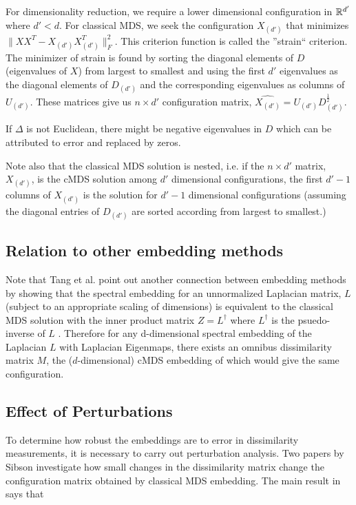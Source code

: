 \documentclass[12pt,oneside,final]{thesis}\usepackage[]{graphicx}\usepackage[]{color}
\begin{document}
For dimensionality reduction, we require a lower dimensional configuration in $\mathbb{R}^{d'}$where $d'<d$. For classical MDS, we seek  the configuration $X_{(d')}$ that minimizes   $\|XX^T-X_{(d')}X_{(d')}^T\|_F^2$. This criterion function is called the ''strain`` criterion. The minimizer of strain is found by sorting the diagonal elements of $D$ (eigenvalues of $X$) from largest to smallest and  using the first $d'$ eigenvalues as the diagonal elements of  $D_{(d')}$ and the corresponding eigenvalues as columns of $U_{(d')}$. These matrices give us $n \times d'$ configuration matrix, $\hat{X_{(d')}}=U_{(d')}D_{(d')}^{\frac{1}{2}}$. 

If $\Delta$ is not Euclidean, there might be negative eigenvalues in $D$ which can be attributed to error and replaced by zeros.

Note also that the classical MDS solution  is nested, i.e. if the $n \times d'$ matrix, $X_{(d')}$,  is the cMDS solution among $d'$ dimensional configurations, the first $d'-1$ columns of $X_{(d')}$ is the solution for $d'-1$ dimensional configurations (assuming the diagonal entries of  $D_{(d')}$ are sorted according from largest to smallest.)


\subsection{Relation to other embedding methods\label{MDS_SpectralEmbed}}

Note that Tang et al.\cite{MinhTrosset_SpectralEmbed} point out another connection between embedding methods by showing that the spectral embedding for  an unnormalized Laplacian matrix, $L$ (subject to  an appropriate scaling of dimensions) is equivalent to the classical MDS solution with the inner product matrix $Z=L^{\dag}$ where $L^{\dag}$ is the psuedo-inverse of $L$ \cite{MinhTrosset_SpectralEmbed}. Therefore for any d-dimensional spectral embedding of the Laplacian $L$  with Laplacian Eigenmaps, there exists an omnibus dissimilarity matrix $M$, the ($d$-dimensional) cMDS embedding of which   would give the same configuration.


\subsection{Effect of Perturbations}
  To determine how robust the embeddings are to error in dissimilarity measurements, it is necessary to carry out perturbation analysis. Two papers by Sibson \cite{Sibson_perturbational1979} investigate how small changes in the dissimilarity matrix change the configuration matrix obtained by classical MDS embedding. The main result in  \cite{Sibson_perturbational1979} says that 
  
\end{document}
